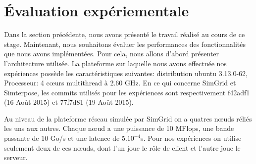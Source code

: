 \section{Évaluation expériementale}
\label{section:evaluation}

Dans la section précédente, nous avons présenté le travail réalisé au cours de ce stage. Maintenant, nous souhaitons évaluer les performances des fonctionnalités que nous avons implémentées. Pour cela, nous allons d'abord présenter l'architecture utilisée. La plateforme sur laquelle nous avons effectuée nos expériences possède les caractéristiques suivantes: distribution ubuntu 3.13.0-62, Processeur: 4 c\oe urs multithread à 2.60 GHz. En ce qui concerne SimGrid et Simterpose, les commits utilisés pour les expériences sont respectivement f42adf1 (16 Août 2015) et 77f7d81 (19 Août 2015). 

Au niveau de la plateforme réseau simulée par SimGrid on a quatres n\oe uds réliés les uns aux autres. Chaque n\oe ud a une puissance de 10 MFlops, une bande passante de 10 Go/s et une latence de $5.10^{-4}$s. Pour nos expériences on utilise seulement deux de ces n\oe uds, dont l'un joue le rôle de client et l'autre joue le serveur. 

